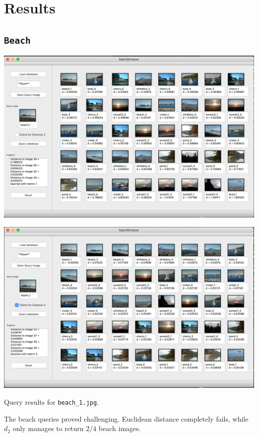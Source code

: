 \documentclass[letterpaper]{article}
\begin{document}
\section{Results}

\subsection{\texttt{Beach}}
\begin{center}
  \includegraphics[width=\textwidth]{beach_1_distance1.png}
  
  \includegraphics[width=\textwidth]{beach_1_distance2.png}
  
  Query results for \texttt{beach\_1.jpg}.
\end{center}

The beach queries proved challenging. Euclidean distance completely fails, while
$d_2$ only manages to return $2/4$ beach images.
\end{document}
